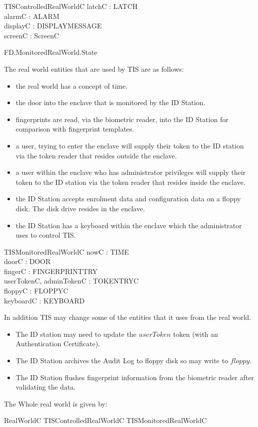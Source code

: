 \begin{schema}{TISControlledRealWorldC}
        latchC : LATCH
\\      alarmC : ALARM
\\      displayC : DISPLAYMESSAGE
\\      screenC : ScreenC
\end{schema}

\begin{traceunit}{FD.MonitoredRealWorld.State}
\end{traceunit}

The real world entities that are used by TIS are as follows:
\begin{itemize}
\item the real world has a concept of time.
\item the door into the enclave that is monitored by the ID Station.
\item fingerprints are read, via the biometric reader, into
the ID Station for comparison with fingerprint templates.
\item a user, trying to enter the enclave will supply
their token to the ID station via the token reader that resides
outside the enclave. 
\item a user within the enclave who has administrator
privileges will supply their token to the ID station via the token
reader that resides inside the enclave.
\item  the ID Station accepts enrolment data and
configuration data on a floppy disk. The disk drive resides in the enclave.
\item  the ID Station has a keyboard within the enclave which the
administrator uses to control TIS. 
\end{itemize}

\begin{schema}{TISMonitoredRealWorldC}
        nowC : TIME
\\      doorC : DOOR
\\      fingerC : FINGERPRINTTRY
\\      userTokenC, adminTokenC : TOKENTRYC
\\      floppyC : FLOPPYC
\\      keyboardC : KEYBOARD
\end{schema}

In addition TIS may change some of the entities that it uses from the
real world.   
\begin{itemize}
\item The ID station may need to update the $userToken$ token
(with an Authentication Certificate).
\item The ID Station archives the Audit Log to floppy disk so may
write to $floppy$.
\item The ID Station flushes fingerprint information from the
biometric reader after validating the data.
\end{itemize}

The Whole real world is given by:

\begin{zed}
RealWorldC  TISControlledRealWorldC \land TISMonitoredRealWorldC
\end{zed}
